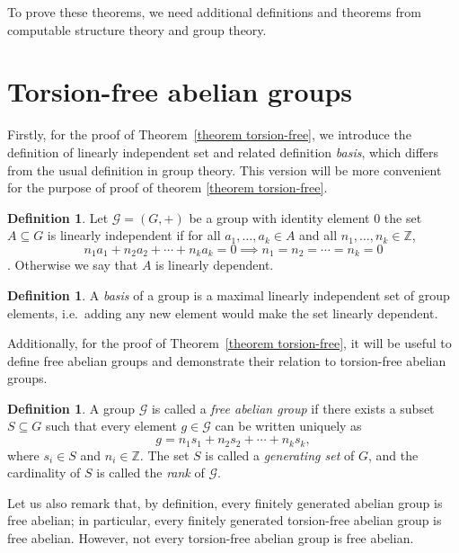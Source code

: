 \documentclass{pracalicmgr2025}
\theoremstyle{plain}            %
\theoremstyle{remark}           %
\theoremstyle{definition}       %
\newtheorem{definition}[theorem]{Definition}
\begin{document}
To prove these theorems, we need additional definitions and theorems from computable structure theory and group theory.
\section{Torsion-free abelian groups}
Firstly, for the proof of Theorem~\ref{theorem torsion-free}, we introduce the definition of linearly independent set and related definition \textit{basis}, which differs from the usual definition in group theory. This version will be more convenient for the purpose of proof of theorem \ref{theorem torsion-free}. 
\begin{definition}
    Let $\mathcal{G} = (G, +)$ be a group with identity element $0$ the set $A \subseteq G$ is linearly independent if for all $a_1,\dots,a_k \in A$ and all $n_1,\dots,n_k \in \mathbb{Z}$,
    $$n_1a_1 + n_2a_2 + \cdots + n_ka_k = 0 \implies n_1 = n_2 = \cdots = n_k =0$$.
    Otherwise we say that $A$ is linearly dependent.
\end{definition}

\begin{definition} \label{basis}
    A \emph{basis} of a group is a maximal linearly independent set of group elements, i.e.\ adding any new element would make the set linearly dependent.
\end{definition}

Additionally, for the proof of Theorem~\ref{theorem torsion-free}, it will be useful to define free abelian groups and demonstrate their relation to torsion-free abelian groups.

\begin{definition}
    A group $\mathcal{G}$ is called a \emph{free abelian group} if there exists a  subset $S \subseteq G$ such that every element $g \in \mathcal{G}$ can be written uniquely as 
    $$
    g = n_1 s_1 + n_2 s_2 + \cdots + n_k s_k,
    $$
    where $s_i \in S$ and $n_i \in \mathbb{Z}$. The set $S$ is called a \emph{generating set} of $G$, and the cardinality of $S$ is called the \emph{rank} of $\mathcal{G}$.
\end{definition}

Let us also remark that, by definition, every finitely generated abelian group is free abelian; in particular, every finitely generated torsion-free abelian group is free abelian. However, not every torsion-free abelian group is free abelian.
\end{document}
